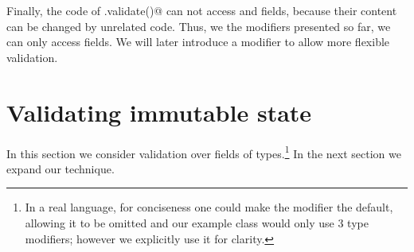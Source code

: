 Finally,
the code of \Q@.validate()@ can not access  \Q@mut@ and \Q@read@ fields,
  because their content can be changed by unrelated code.
Thus, we the modifiers presented so far, we can only access \Q@imm@ fields.
We will later introduce a \Q@capsule@ modifier to allow more flexible validation.



%

\section{Validating immutable state}
In this section we consider validation over fields of \Q@imm@ types.\footnote{
In a real language, for conciseness one could make the \Q@imm@ modifier the default, allowing it to be omitted and our \Q@Person@ example class would only use 3 type modifiers; however we explicitly use it for clarity.
}
In the next section we expand our technique.

